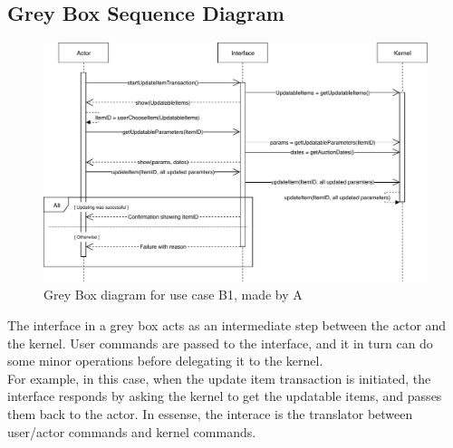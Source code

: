 \subsection*{Grey Box Sequence Diagram}
\begin{figure}[H]
	\centering
	\includegraphics[scale=.9]{uml/SD-gb-update.pdf}
	\caption*{Grey Box diagram for use case B1, made by A}
\end{figure}
The interface in a grey box acts as an intermediate step between the actor and the kernel. User commands are passed to the interface, and it in turn can do some minor operations before delegating it to the kernel.\\For example, in this case, when the update item transaction is initiated, the interface responds by asking the kernel to get the updatable items, and passes them back to the actor. In essense, the interace is the translator between user/actor commands and kernel commands.
